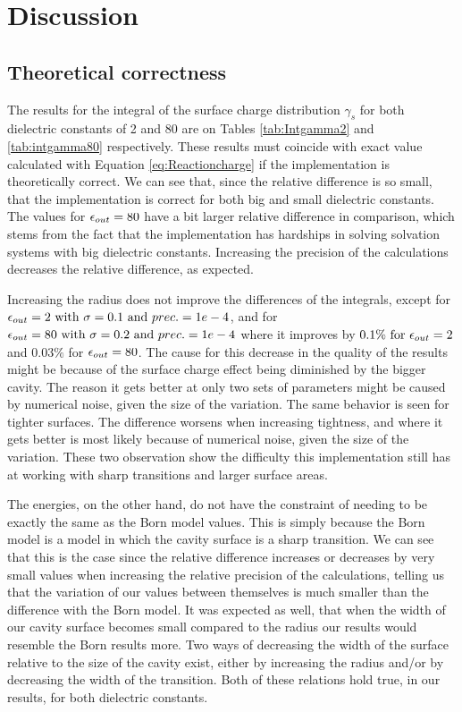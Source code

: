 \documentclass[../master_thesis.tex]{subfiles}
\begin{document}
\section{Discussion}
\subsection{Theoretical correctness }
The results for the integral of the surface charge distribution $\gamma_s$ for
both dielectric constants of 2 and 80 are on Tables \ref{tab:Intgamma2} and \ref{tab:intgamma80}
respectively. These results must coincide with  exact value calculated with Equation \ref{eq:Reactioncharge}
if the implementation is theoretically correct. We can see that, since the relative difference is
so small, that the implementation is correct for both big and small dielectric constants.
The values for $\epsilon_{out} = 80$ have a bit larger relative difference in comparison, which stems from
the fact that the implementation has hardships in solving solvation systems with big dielectric constants.
Increasing the precision of the calculations decreases the relative difference, as expected.

Increasing the radius does not improve the differences of the integrals, except for
$\epsilon_{out} = 2 \text{ with } \sigma = 0.1 \text{ and } prec. = 1e-4$, and for
$\epsilon_{out} = 80 \text{ with } \sigma = 0.2 \text{ and } prec. = 1e-4$ where it improves by
$0.1\% \text{ for } \epsilon_{out} = 2$ and $0.03\%$ for $\epsilon_{out} = 80$. The cause for
this decrease in the quality of the \mrchem results might be because of the surface
charge effect being diminished by the bigger cavity. The reason it gets better at
only two sets of parameters might be caused by numerical noise, given the size of
the variation.
The same  behavior is seen for tighter surfaces. The difference worsens
when increasing tightness, and where it gets better is most likely because of numerical noise,
given the size of the variation. These two observation show the difficulty this implementation still
has at working with sharp transitions and larger surface areas.

The energies, on the other hand, do not have the constraint of needing to be exactly the same as
the Born model values. This is simply because the Born model is a model in which
the cavity surface is a sharp transition. We can see that this is the case since the
relative difference increases or decreases by very small  values when increasing the
relative precision of the calculations, telling us that
the variation of our values between themselves is much smaller than  the difference
with the Born model.
It was expected as well, that when the width of our cavity surface becomes small
compared to the radius our results would resemble
the Born results more. Two ways of decreasing the width of the surface relative to the
size of the cavity exist, either by increasing the  radius and/or by decreasing the width of the transition.
Both of these relations hold true, in our results, for both dielectric constants.
\end{document}
